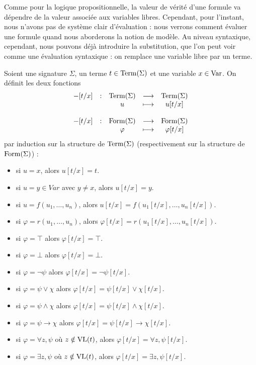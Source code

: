 Comme pour la logique propositionnelle, la valeur de vérité d'une formule va
dépendre de la valeur associée aux variables libres. Cependant, pour l'instant,
nous n'avons pas de système clair d'évaluation : nous verrons comment évaluer
une formule quand nous aborderons la notion de modèle. Au niveau syntaxique,
cependant, nous pouvons déjà introduire la substitution, que l'on peut voir
comme une évaluation syntaxique : on remplace une variable libre par un terme.

\begin{definition}[Substitution]
  Soient une signature $\Sigma$, un terme $t\in \operatorname{Term}(\Sigma)$ et une variable
  $x\in \operatorname{Var}$. On définit les deux fonctions
  \[\begin{array}{rcccc}
  -[t/x] &: & \operatorname{Term}(\Sigma) & \longrightarrow & \operatorname{Term}(\Sigma)\\
  & & u & \longmapsto & u[t/x] \\
  \\
  -[t/x] &: & \operatorname{Form}(\Sigma) & \longrightarrow & \operatorname{Form}(\Sigma)\\
  & & \varphi & \longmapsto & \varphi[t/x]
  \end{array}\]
  par induction sur la structure de $\operatorname{Term}(\Sigma)$ (respectivement sur la
  structure de $\operatorname{Form}(\Sigma)$) :
  \begin{itemize}
  \item si $u = x$, alors $u[t/x] = t$.
  \item si $u = y\in Var$ avec $y \neq x$, alors $u[t/x] = y$.
  \item si $u = f(u_1,\ldots,u_n)$, alors
    $u[t/x] = f(u_1[t/x],\ldots,u_n[t/x])$.
  \item si $\varphi = r(u_1,\ldots,u_n)$, alors
    $\varphi[t/x] = r(u_1[t/x],\ldots,u_n[t/x])$.
  \item si $\varphi = \top$ alors $\varphi[t/x] = \top$.
  \item si $\varphi = \bot$ alors $\varphi[t/x] = \bot$.
  \item si $\varphi = \lnot \psi$ alors $\varphi[t/x] = \lnot \psi[t/x]$.
  \item si $\varphi = \psi \lor \chi$ alors
    $\varphi[t/x] = \psi[t/x]\lor\chi[t/x]$.
  \item si $\varphi = \psi \land \chi$ alors
    $\varphi[t/x] = \psi[t/x]\land\chi[t/x]$.
  \item si $\varphi = \psi \to \chi$ alors
    $\varphi[t/x] = \psi[t/x]\to\chi[t/x]$.
  \item si $\varphi = \forall z, \psi$ où $z\notin \operatorname{VL}(t)$, alors
    $\varphi[t/x] = \forall z, \psi[t/x]$.
  \item si $\varphi = \exists z, \psi$ où $z\notin \operatorname{VL}(t)$, alors
    $\varphi[t/x] = \exists z, \psi[t/x]$.
  \end{itemize}
\end{definition}

